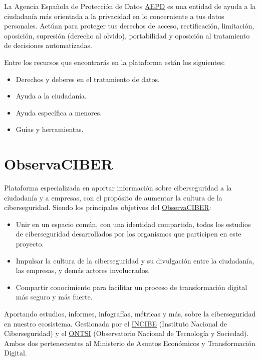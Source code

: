 \documentclass[
  spanish,
  a4paper,
  openany]{book}
\begin{document}
La Agencia Española de Protección de Datos \href{https://www.aepd.es/es}{AEPD} es una entidad de ayuda a la ciudadanía más orientada a la privacidad en lo concerniente a tus datos personales. Actúan para proteger tus derechos de acceso, rectificación, limitación, oposición, supresión (derecho al olvido), portabilidad y oposición al tratamiento de decisiones automatizadas.

Entre los recursos que encontrarás en la plataforma están los siguientes:

\begin{itemize}
\item
  Derechos y deberes en el tratamiento de datos.
\item
  Ayuda a la ciudadanía.
\item
  Ayuda específica a menores.
\item
  Guías y herramientas.
\end{itemize}

\hypertarget{observaciber}{%
\section{ObservaCIBER}\label{observaciber}}

Plataforma especializada en aportar información sobre ciberseguridad a la ciudadanía y a empresas, con el propósito de aumentar la cultura de la ciberseguridad. Siendo los principales objetivos del \href{https://observaciber.es/}{ObservaCIBER}:

\begin{itemize}
\item
  Unir en un espacio común, con una identidad compartida, todos los estudios de ciberseguridad desarrollados por los organismos que participen en este proyecto.
\item
  Impulsar la cultura de la ciberseguridad y su divulgación entre la ciudadanía, las empresas, y demás actores involucrados.
\item
  Compartir conocimiento para facilitar un proceso de transformación digital más seguro y más fuerte.
\end{itemize}

Aportando estudios, informes, infografías, métricas y más, sobre la ciberseguridad en nuestro ecosistema. Gestionada por el \href{https://www.incibe.es/}{INCIBE} (Instituto Nacional de Ciberseguridad) y el \href{https://www.ontsi.es/es}{ONTSI} (Observatorio Nacional de Tecnología y Sociedad). Ambos dos pertenecientes al Ministerio de Asuntos Económicos y Transformación Digital.
\end{document}
